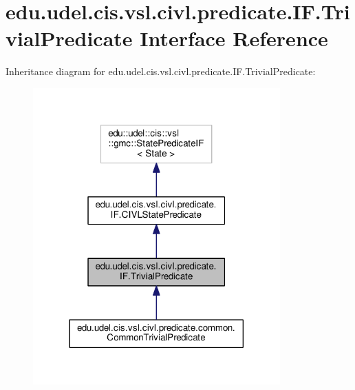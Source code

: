 \hypertarget{interfaceedu_1_1udel_1_1cis_1_1vsl_1_1civl_1_1predicate_1_1IF_1_1TrivialPredicate}{}\section{edu.\+udel.\+cis.\+vsl.\+civl.\+predicate.\+I\+F.\+Trivial\+Predicate Interface Reference}
\label{interfaceedu_1_1udel_1_1cis_1_1vsl_1_1civl_1_1predicate_1_1IF_1_1TrivialPredicate}


Inheritance diagram for edu.\+udel.\+cis.\+vsl.\+civl.\+predicate.\+I\+F.\+Trivial\+Predicate\+:
\nopagebreak
\begin{figure}[H]
\begin{center}
\leavevmode
\includegraphics[width=269pt]{interfaceedu_1_1udel_1_1cis_1_1vsl_1_1civl_1_1predicate_1_1IF_1_1TrivialPredicate__inherit__graph}
\end{center}
\end{figure}



